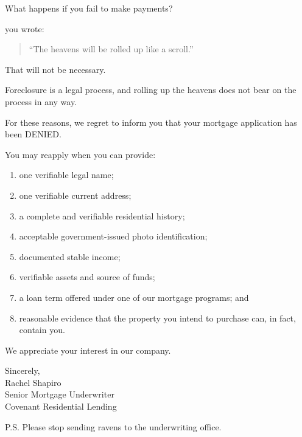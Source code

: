 {{What happens if you fail to make payments?

you wrote:

\begin{quote}
``The heavens will be rolled up like a scroll.''
\end{quote}

That will not be necessary.

Foreclosure is a legal process, and rolling up the heavens does not bear on the process in any way.

For these reasons, we regret to inform you that your mortgage application has been DENIED.

You may reapply when you can provide:

\begin{enumerate}
\item one verifiable legal name;
\item one verifiable current address;
\item a complete and verifiable residential history;
\item acceptable government-issued photo identification;
\item documented stable income;
\item verifiable assets and source of funds;
\item a loan term offered under one of our mortgage programs; and
\item reasonable evidence that the property you intend to purchase can, in fact, contain you.
\end{enumerate}

We appreciate your interest in our company.

Sincerely,\\Rachel Shapiro\\Senior Mortgage Underwriter\\Covenant Residential Lending

P.S. Please stop sending ravens to the underwriting office.

}
}

